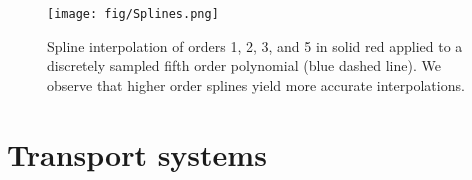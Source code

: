 
\begin{figure}[h!] 
\centering
\texttt{[image: fig/Splines.png]}
\caption{Spline interpolation of orders 1, 2, 3, and 5 in solid red applied to a discretely sampled fifth order polynomial (blue dashed line). We observe that higher order splines yield more accurate interpolations.}
\label{fig:Splines}
\end{figure}




\section{Transport systems}\label{sec:TransportSystems}

